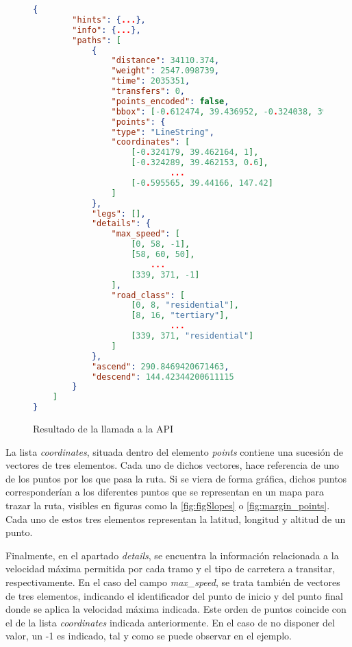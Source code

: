 \documentclass[11pt,spanish,listoffigures,listoftables]{tfgetsinf}
\begin{document}
\begin{figure}[!htb]
    \begin{lstlisting}[language=json,numbers=none]
    {
        "hints": {...},
        "info": {...},
        "paths": [
            {
                "distance": 34110.374,
                "weight": 2547.098739,
                "time": 2035351,
                "transfers": 0,
                "points_encoded": false,
                "bbox": [-0.612474, 39.436952, -0.324038, 39.481743],
                "points": {
                "type": "LineString",
                "coordinates": [
                    [-0.324179, 39.462164, 1],
                    [-0.324289, 39.462153, 0.6],
                            ...
                    [-0.595565, 39.44166, 147.42]
                ]
            },
            "legs": [],
            "details": {
                "max_speed": [
                    [0, 58, -1],
                    [58, 60, 50],
                        ...
                    [339, 371, -1]
                ],
                "road_class": [
                    [0, 8, "residential"],
                    [8, 16, "tertiary"],
                            ...
                    [339, 371, "residential"]
                ]
            },
            "ascend": 290.8469420671463,
            "descend": 144.42344200611115
        }
    ]
}
    \end{lstlisting}
    \caption{Resultado de la llamada a la API}
    \label{fig:graphhopper_json}
\end{figure}

La lista \textit{coordinates}, situada dentro del elemento \textit{points} contiene una sucesión de vectores de tres elementos. Cada uno de dichos vectores, hace referencia de uno de los puntos por los que pasa la ruta. Si se viera de forma gráfica, dichos puntos corresponderían a los diferentes puntos que se representan en un mapa para trazar la ruta, visibles en figuras como la \ref{fig:figSlopes} o \ref{fig:margin_points}. Cada uno de estos tres elementos representan la latitud, longitud y altitud de un punto.

Finalmente, en el apartado \textit{details}, se encuentra la información relacionada a la velocidad máxima permitida por cada tramo y el tipo de carretera a transitar, respectivamente. En el caso del campo \textit{max\_speed}, se trata también de vectores de tres elementos, indicando el identificador del punto de inicio y del punto final donde se aplica la velocidad máxima indicada. Este orden de puntos coincide con el de la lista \textit{coordinates} indicada anteriormente. En el caso de no disponer del valor, un -1 es indicado, tal y como se puede observar en el ejemplo.
\end{document}

